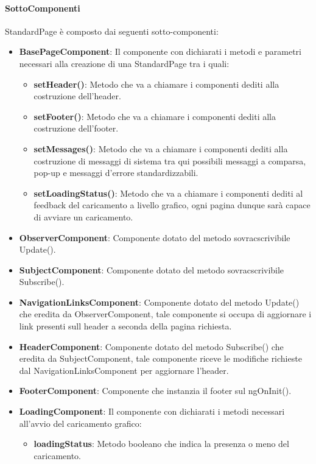 \paragraph{SottoComponenti}
StandardPage è composto dai seguenti sotto-componenti:
\begin{itemize}
    \item \textbf{BasePageComponent}: Il componente con dichiarati i metodi e parametri necessari alla creazione di una StandardPage tra i quali:
    \begin{itemize}
        \item \textbf{setHeader()}: Metodo che va a chiamare i componenti dediti alla costruzione dell'header.
        \item \textbf{setFooter()}: Metodo che va a chiamare i componenti dediti alla costruzione dell'footer.
        \item \textbf{setMessages()}: Metodo che va a chiamare i componenti dediti alla costruzione di messaggi di sistema tra qui possibili messaggi a comparsa, pop-up e messaggi d'errore standardizzabili.
        \item \textbf{setLoadingStatus()}: Metodo che va a chiamare i componenti dediti al feedback del caricamento a livello grafico, ogni pagina dunque sarà capace di avviare un caricamento.
    \end{itemize}
    \item \textbf{ObserverComponent}: Componente dotato del metodo sovracscrivibile Update().
    \item \textbf{SubjectComponent}: Componente dotato del metodo sovracscrivibile Subscribe().
    \item \textbf{NavigationLinksComponent}: Componente dotato del metodo Update() che eredita da ObserverComponent, tale componente si occupa di aggiornare i link presenti sull header a seconda della pagina richiesta.
    \item \textbf{HeaderComponent}: Componente dotato del metodo Subscribe() che eredita da SubjectComponent, tale componente riceve le modifiche richieste dal NavigationLinksComponent per aggiornare l'header.
    \item \textbf{FooterComponent}: Componente che instanzia il footer sul ngOnInit().
    \item \textbf{LoadingComponent}: Il componente con dichiarati i metodi necessari all'avvio del caricamento grafico:
    \begin{itemize}
        \item \textbf{loadingStatus}: Metodo booleano che indica la presenza o meno del caricamento.

\end{itemize}
\end{itemize}
